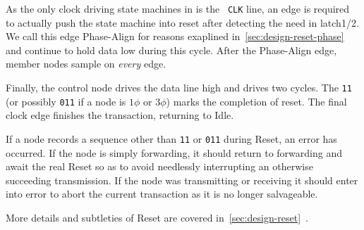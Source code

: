 As the only clock driving state machines in \bus is the \bus~{\tt CLK} line,
an edge is required to actually push the state machine into {\sc reset} after
detecting the need in {\sc latch1/2}. We call this edge Phase-Align for reasons
exaplined in~\ref{sec:design-reset-phase}~ and
continue to hold data low during this cycle. After the Phase-Align edge,
member nodes sample on {\em every} edge.

Finally, the control node drives the data line high and drives two cycles. The
{\tt 11} (or possibly {\tt 011} if a node is $1\phi$ or $3\phi$) marks the
completion of reset. The final clock edge finishes the transaction, returning
\bus to Idle.

If a node records a sequence other than {\tt 11} or {\tt 011} during Reset, an
error has occurred. If the node is simply forwarding, it should return to
forwarding and await the real Reset so as to avoid needlessly interrupting an
otherwise succeeding transmission. If the node was transmitting or receiving
it should enter into {\sc error} to abort the current transaction as it is no
longer salvageable.

More details and subtleties of Reset are covered
in~\ref{sec:design-reset}~.
